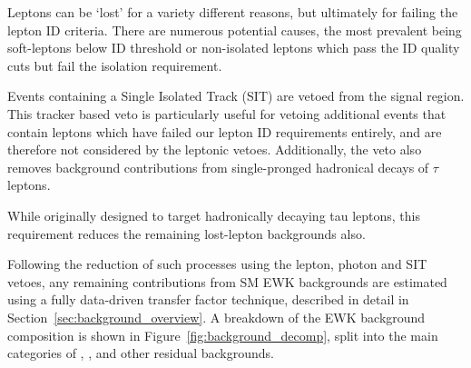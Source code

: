 
Leptons can be `lost' for a variety different reasons, but ultimately for failing
the lepton ID criteria. There are numerous potential causes, the 
most prevalent being soft-leptons below ID threshold or non-isolated leptons 
which pass the ID quality cuts but fail the isolation requirement.

Events containing a Single Isolated Track (SIT) are vetoed from the signal 
region. This tracker based veto is particularly useful for vetoing additional events 
that contain leptons which have failed our lepton ID requirements entirely, and 
are therefore not considered by the leptonic vetoes. Additionally, the veto also
removes background contributions from single-pronged hadronical decays of $\tau$
leptons.

While originally designed to target hadronically decaying tau leptons, 
this requirement reduces the remaining lost-lepton backgrounds also.

Following the reduction of such processes using the lepton, photon and SIT vetoes,
any remaining contributions from SM EWK backgrounds are estimated using a 
fully data-driven transfer factor technique, described in detail in
Section~\ref{sec:background_overview}. A breakdown of the EWK background 
composition is shown in Figure~\ref{fig:background_decomp}, split into the main 
categories of \zinv, \wj, \ttbar and other residual backgrounds.

